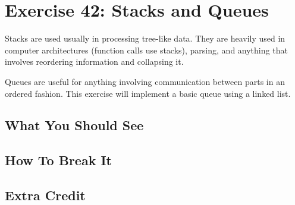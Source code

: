 \chapter{Exercise 42: Stacks and Queues}

Stacks are used usually in processing tree-like data.  They are heavily used
in computer architectures (function calls use stacks), parsing, and anything
that involves reordering information and collapsing it.

Queues are useful for anything involving communication between parts in an ordered fashion.
This exercise will implement a basic queue using a linked list.




\section{What You Should See}


\section{How To Break It}


\section{Extra Credit}



